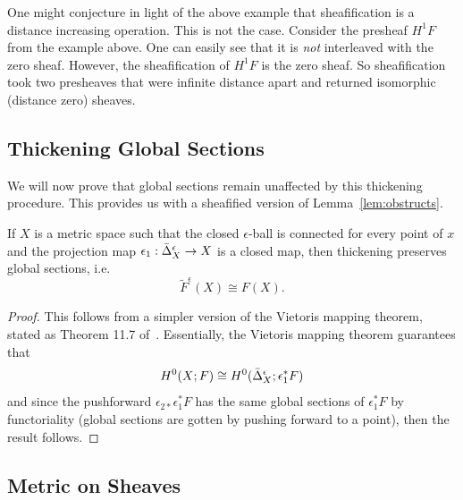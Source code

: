 One might conjecture in light of the above example that sheafification is a distance increasing operation. This is not the case. Consider the presheaf $H^1F$ from the example above. One can easily see that it is \emph{not} interleaved with the zero sheaf. However, the sheafification of $H^1F$ is the zero sheaf. So sheafification took two presheaves that were infinite distance apart and returned isomorphic (distance zero) sheaves.

\subsection{Thickening Global Sections}

We will now prove that global sections remain unaffected by this thickening procedure. This provides us with a sheafified version of Lemma~\ref{lem:obstructs}.

\begin{lem}
If $X$ is a metric space such that the closed $\epsilon$-ball is connected for every point of $x$ and the projection map $\epsilon_1:\Bar{\Delta}^{\epsilon}_X\to X$ is a closed map, then thickening preserves global sections, i.e.
\[
	\widetilde{F}^{\epsilon}(X)\cong F(X).
\]
\end{lem}
\begin{proof}
This follows from a simpler version of the Vietoris mapping theorem, stated as Theorem 11.7 of~\cite{Bredon}. Essentially, the Vietoris mapping theorem guarantees that
\[
H^0(X;F)\cong H^0(\Bar{\Delta}^{\epsilon}_X;\epsilon_1^*F)
\]
and since the pushforward $\epsilon_{2*}\epsilon_1^*F$ has the same global sections of $\epsilon_1^*F$ by functoriality (global sections are gotten by pushing forward to a point), then the result follows.
\end{proof}

\subsection{Metric on Sheaves}

